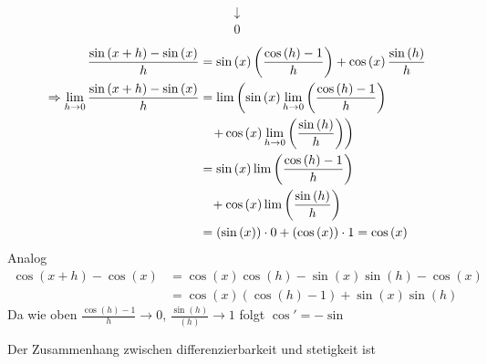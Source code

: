\begin{enumerate}
\begin{align*}
{{{\begin{array}{*{20}{c}}
 \downarrow \\
0
\end{array}} }}
\end{align*}
\begin{align*}
\frac{{\sin \left( {x + h} \right) - \sin \left( x \right)}}{h} &= \sin \left( x \right)\left( {\frac{{\cos \left( h \right) - 1}}{h}} \right) + \cos \left( x \right)\frac{{\sin \left( h \right)}}{h}\\
 \Rightarrow \mathop {\lim }\limits_{h \to 0} \frac{{\sin \left( {x + h} \right) - \sin \left( x \right)}}{h} &= \lim \left( {\sin \left( x \right)\mathop {\lim }\limits_{h \to 0} \left( {\frac{{\cos \left( h \right) - 1}}{h}} \right)} \right.\\
&\left. { \hspace{3mm}+ \cos \left( x \right)\mathop {\lim }\limits_{h \to 0} \left( {\frac{{\sin \left( h \right)}}{h}} \right)} \right)\\
 &= \sin \left( x \right)\lim \left( {\frac{{\cos \left( h \right) - 1}}{h}} \right)\\
 &\hspace{3mm}+ \cos \left( x \right)\lim \left( {\frac{{\sin \left( h \right)}}{h}} \right)\\
& = \left( {\sin \left( x \right)} \right) \cdot 0 + \left( {\cos \left( x \right)} \right) \cdot 1 = \cos \left( x \right)
\end{align*}
Analog 
\begin{align*}
\cos \left( {x + h} \right) - \cos \left( x \right) &= \cos \left( x \right)\cos \left( h \right) - \sin \left( x \right)\sin \left( h \right) - \cos \left( x \right)\\
& = \cos \left( x \right)\left( {\cos \left( h \right) - 1} \right) + \sin \left( x \right)\sin \left( h \right)
\end{align*}
Da wie oben $\frac{{\cos \left( h \right) - 1}}{h} \to 0$, $\frac{{\sin \left( h \right)}}{{\left( h \right)}} \to 1$ folgt $\cos'=-\sin$
\end{enumerate}
Der Zusammenhang zwischen differenzierbarkeit und stetigkeit ist
